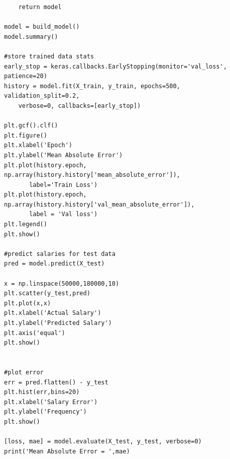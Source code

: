\documentclass[11pt]{article}
\begin{document}
\begin{lstlisting}
    return model

model = build_model()
model.summary()

#store trained data stats 
early_stop = keras.callbacks.EarlyStopping(monitor='val_loss', patience=20)
history = model.fit(X_train, y_train, epochs=500, validation_split=0.2, 
	verbose=0, callbacks=[early_stop])

plt.gcf().clf()
plt.figure()
plt.xlabel('Epoch')
plt.ylabel('Mean Absolute Error')
plt.plot(history.epoch, np.array(history.history['mean_absolute_error']),
       label='Train Loss')
plt.plot(history.epoch, np.array(history.history['val_mean_absolute_error']),
       label = 'Val loss')
plt.legend()
plt.show()

#predict salaries for test data
pred = model.predict(X_test)

x = np.linspace(50000,180000,10)
plt.scatter(y_test,pred)
plt.plot(x,x)
plt.xlabel('Actual Salary')
plt.ylabel('Predicted Salary')
plt.axis('equal')
plt.show()


#plot error
err = pred.flatten() - y_test
plt.hist(err,bins=20)
plt.xlabel('Salary Error')
plt.ylabel('Frequency')
plt.show()

[loss, mae] = model.evaluate(X_test, y_test, verbose=0)
print('Mean Absolute Error = ',mae)

\end{lstlisting}
\end{document}
